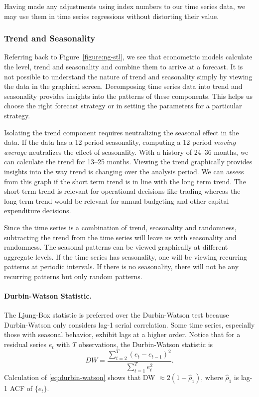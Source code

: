 Having made any adjustments using index numbers to our time series data, we may use them in time series regressions without distorting their value.

\subsubsection{Trend and Seasonality}
Referring back to Figure~\ref{figure:ng-stl}, we see that econometric models calculate the level, trend and seasonality and combine them to arrive at a forecast. It is not possible to understand the nature of trend and seasonality simply by viewing the data in the graphical screen. Decomposing time series data into trend and seasonality provides insights into the patterns of these components. This helps us choose the right forecast strategy or in setting the
parameters for a particular strategy.

Isolating the trend component requires neutralizing the seasonal effect in the data. If the data has a 12 period seasonality, computing a 12 period \emph{moving average} neutralizes the effect of seasonality. With a history of 24--36 months, we can calculate the trend for 13--25 months. Viewing the trend graphically provides insights into the way trend is changing over the analysis period. We can assess from this graph if the short term trend is in line with the long term trend. The short term trend is relevant for operational decisions like trading whereas the long term trend would be relevant for annual budgeting and other capital expenditure decisions.

Since the time series is a combination of trend, seasonality and randomness, subtracting the trend from the time series will leave us with seasonality and randomness. The seasonal patterns can be viewed graphically at different aggregate levels. If the time series has
seasonality, one will be viewing recurring patterns at periodic intervals. If there is no seasonality, there will not be any recurring patterns but only random patterns.

\paragraph{Durbin-Watson Statistic.}
The Ljung-Box statistic is preferred over the Durbin-Watson test because Durbin-Watson only considers lag-1 serial correlation. Some time series, especially those with seasonal behavior, exhibit lags at a higher order. Notice that for a residual series $e_t$ with $T$ observations, the Durbin-Watson statistic is
\begin{equation}
DW = \frac{\sum^T_{t=2}(e_t-e_{t-1})^2}{\sum^T_{t=1}e^2_t}.
\label{eq:durbin-watson}
\end{equation}
Calculation of \eqref{eq:durbin-watson} shows that DW $\approx 2(1-\hat{\rho}_1)$, where $\hat{\rho}_1$ is lag-1 ACF of $\{e_t\}$.

